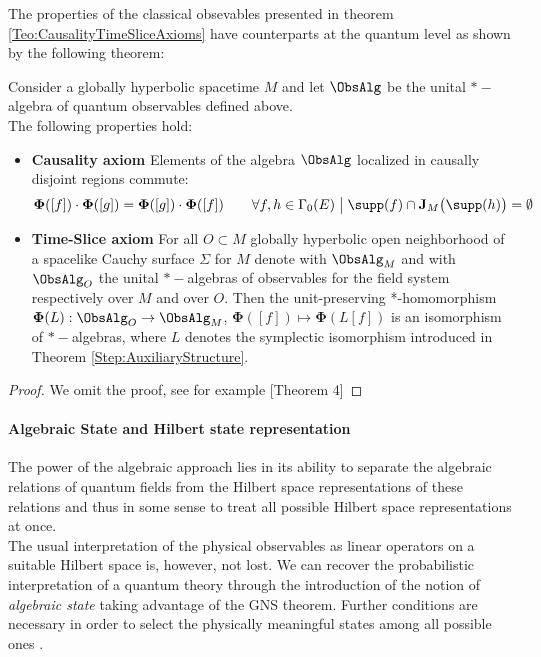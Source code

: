 \documentclass[Main]{subfiles}
\begin{document}
   			The properties of the classical obsevables presented in theorem \ref{Teo:CausalityTimeSliceAxioms} have counterparts at the quantum level as shown by the following theorem:
				\begin{theorem}\label{Teo:QuantumCausalityTimeSliceAxioms}
					Consider a globally hyperbolic spacetime $M$ and let $\ObsAlg$ be the unital $\ast-$algebra of quantum observables defined above.\\
					The following properties hold:
					\begin{itemize}
						\item \textbf{Causality axiom}
							Elements of the algebra $\ObsAlg$ localized in causally disjoint regions commute:
							\begin{displaymath}
								\mathbf{\Phi}([f]) \cdot \mathbf{\Phi}([g]) = \mathbf{\Phi}([g]) \cdot \mathbf{\Phi}([f]) \qquad
								\forall f,h \in \Gamma_0(E) \; \big\vert \; \supp(f) \cap \textbf{J}_M \big(\supp(h) \big) = \emptyset
							\end{displaymath}
						\item \textbf{Time-Slice axiom}
							For all $O \subset M$ globally hyperbolic open neighborhood of a spacelike Cauchy surface $\Sigma$ for $M$ denote
							with $\ObsAlg_M$ and with $\ObsAlg_O$ the unital $\ast-$algebras of observables for the field system respectively over $M$ and over $O$.
							Then the unit-preserving *-homomorphism $\mathbf{\Phi}(L):\ObsAlg_O \rightarrow \ObsAlg_M $, $ \mathbf{\Phi}([ f ]) \mapsto \mathbf{\Phi} (L[f])$ is an isomorphism of $\ast-$algebras, where $L$ denotes the symplectic isomorphism introduced in Theorem \ref{Step:AuxiliaryStructure}.
					\end{itemize}
				\end{theorem}
				\begin{proof}
					We omit the proof, see for example \cite{Benini2013}[Theorem 4]
				\end{proof}

   		\paragraph{Algebraic State and Hilbert state representation}
			The power of the algebraic approach lies in its ability to separate the algebraic relations of quantum fields from the Hilbert space representations of these relations and thus in some sense to treat all possible Hilbert space representations at once. \\
			The usual interpretation of the physical observables as linear operators on a suitable Hilbert space is, however, not lost.
			We can recover the probabilistic interpretation of a quantum theory through the introduction of the notion of \emph{algebraic state} taking advantage of the GNS theorem.
			Further conditions are necessary in order to select the physically meaningful states among all possible ones .
\end{document}
